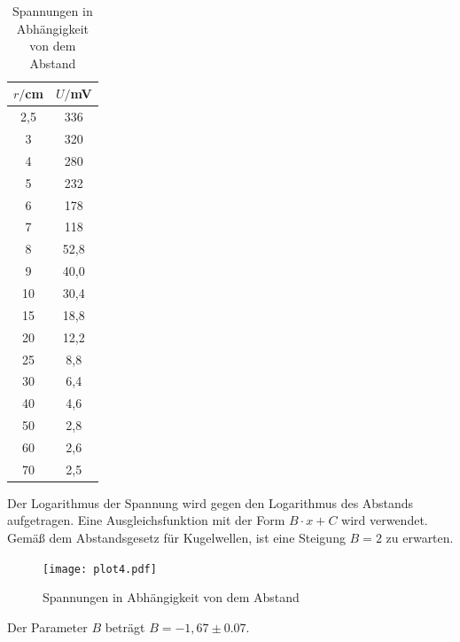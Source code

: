 \begin{table}[H]
  \centering
  \caption{Spannungen in Abhängigkeit von dem Abstand}
  \label{tab:Phase}
  \begin{tabular}{c c}
    \toprule
    $r/$cm  &  $U/$mV \\
    \midrule
     2,5   &    336    \\
     3     &    320    \\
     4     &    280    \\
     5     &    232    \\
     6     &    178    \\
     7     &    118    \\
     8     &    52,8    \\
     9     &    40,0    \\
    10     &    30,4    \\
    15     &    18,8    \\
    20     &    12,2    \\
    25     &    8,8     \\
    30     &    6,4     \\
    40     &    4,6     \\
    50     &    2,8     \\
    60     &    2,6     \\
    70     &    2,5     \\
    \bottomrule
  \end{tabular}
\end{table}

Der Logarithmus der Spannung wird gegen den Logarithmus des Abstands aufgetragen. Eine Ausgleichsfunktion mit der Form $B \cdot x + C$ wird verwendet. Gemäß dem
Abstandsgesetz für Kugelwellen, ist eine Steigung $B = 2$ zu erwarten.

\begin{figure}[H]
  \centering
  \texttt{[image: plot4.pdf]}
  \caption{Spannungen in Abhängigkeit von dem Abstand}
  \label{fig:plot4}
\end{figure}

Der Parameter $B$ beträgt $B= -1,67 \pm 0.07$.
